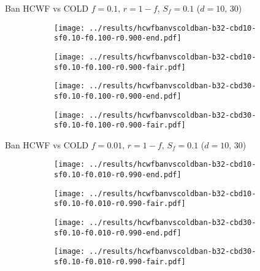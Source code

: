 \documentclass[8pt,a4paper]{beamer}
\begin{document}
	\begin{frame}{Ban HCWF vs COLD $f=0.1,\, r=1-f,\,S_f=0.1$  ($d=10,\, 30$)}
		\begin{figure}
			\begin{subfigure}{.48\textwidth}
				\centering
				\texttt{[image: ../results/hcwfbanvscoldban-b32-cbd10-sf0.10-f0.100-r0.900-end.pdf]}
			\end{subfigure}
			\begin{subfigure}{.48\textwidth}
				\centering
				\texttt{[image: ../results/hcwfbanvscoldban-b32-cbd10-sf0.10-f0.100-r0.900-fair.pdf]}
			\end{subfigure}
		\end{figure}
		
		\begin{figure}
			\begin{subfigure}{.48\textwidth}
				\centering
				\texttt{[image: ../results/hcwfbanvscoldban-b32-cbd30-sf0.10-f0.100-r0.900-end.pdf]}
			\end{subfigure}
			\begin{subfigure}{.48\textwidth}
				\centering
				\texttt{[image: ../results/hcwfbanvscoldban-b32-cbd30-sf0.10-f0.100-r0.900-fair.pdf]}
			\end{subfigure}
		\end{figure}
	\end{frame}

	\begin{frame}{Ban HCWF vs COLD $f=0.01,\, r=1-f,\,S_f=0.1$  ($d=10,\, 30$)}
		\begin{figure}
			\begin{subfigure}{.48\textwidth}
				\centering
				\texttt{[image: ../results/hcwfbanvscoldban-b32-cbd10-sf0.10-f0.010-r0.990-end.pdf]}
			\end{subfigure}
			\begin{subfigure}{.48\textwidth}
				\centering
				\texttt{[image: ../results/hcwfbanvscoldban-b32-cbd10-sf0.10-f0.010-r0.990-fair.pdf]}
			\end{subfigure}
		\end{figure}
		
		\begin{figure}
			\begin{subfigure}{.48\textwidth}
				\centering
				\texttt{[image: ../results/hcwfbanvscoldban-b32-cbd30-sf0.10-f0.010-r0.990-end.pdf]}
			\end{subfigure}
			\begin{subfigure}{.48\textwidth}
				\centering
				\texttt{[image: ../results/hcwfbanvscoldban-b32-cbd30-sf0.10-f0.010-r0.990-fair.pdf]}
			\end{subfigure}
		\end{figure}
	\end{frame}
	
\end{document}
